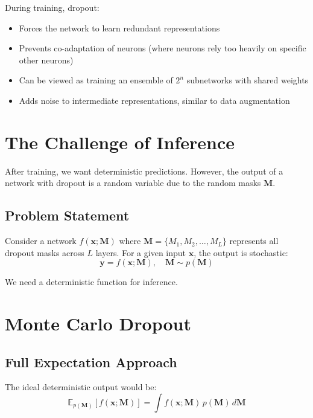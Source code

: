 \begin{notechapter}
During training, dropout:
\begin{itemize}
    \item Forces the network to learn redundant representations
    \item Prevents co-adaptation of neurons (where neurons rely too heavily on specific other neurons)
    \item Can be viewed as training an ensemble of $2^n$ subnetworks with shared weights
    \item Adds noise to intermediate representations, similar to data augmentation
\end{itemize}

\section{The Challenge of Inference}

After training, we want deterministic predictions. However, the output of a network with dropout is a random variable due to the random masks $\mathbf{M}$.

\subsection{Problem Statement}

Consider a network $f(\mathbf{x}; \mathbf{M})$ where $\mathbf{M} = \{M_1, M_2, \ldots, M_L\}$ represents all dropout masks across $L$ layers. For a given input $\mathbf{x}$, the output is stochastic:
\begin{equation}
\mathbf{y} = f(\mathbf{x}; \mathbf{M}), \quad \mathbf{M} \sim p(\mathbf{M})
\end{equation}

We need a deterministic function for inference.

\section{Monte Carlo Dropout}

\subsection{Full Expectation Approach}

The ideal deterministic output would be:
\begin{equation}
\mathbb{E}_{p(\mathbf{M})}[f(\mathbf{x}; \mathbf{M})] = \int f(\mathbf{x}; \mathbf{M}) \, p(\mathbf{M}) \, d\mathbf{M}
\end{equation}


\end{notechapter}

